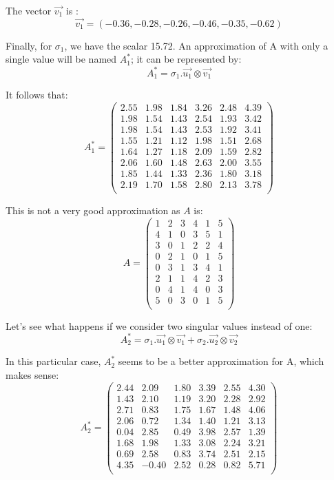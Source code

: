 \documentclass[a4,12pt,twosided,openany]{memoir}
\begin{document}
The vector $\overrightarrow{v_1}$ is :
\[\overrightarrow{v_1} = (-0.36, -0.28, -0.26, -0.46, -0.35, -0.62 )\]

Finally, for $\sigma_1$, we have the scalar 15.72. An approximation of A with only a single value will be named $A_1^*$; it can be represented by:
\[A^*_1 = \sigma_1.\overrightarrow{u_1} \otimes \overrightarrow{v_1}\]

It follows that:
\[A^*_1 = \begin{pmatrix}
2.55 &  1.98 & 1.84 &  3.26 &  2.48 & 4.39 \\
1.98 & 1.54 & 1.43 & 2.54 & 1.93 & 3.42 \\
1.98 & 1.54 & 1.43 & 2.53 &  1.92 & 3.41 \\
1.55 & 1.21 & 1.12 & 1.98 & 1.51 & 2.68 \\
1.64 & 1.27 & 1.18 & 2.09 & 1.59 & 2.82 \\
2.06 & 1.60 & 1.48 & 2.63 &  2.00 & 3.55 \\
1.85 & 1.44 & 1.33 & 2.36 & 1.80 & 3.18 \\
2.19 & 1.70 & 1.58 & 2.80 & 2.13 & 3.78 \\
\end{pmatrix}
\]
\par 
\indent
This is not a very good approximation as $A$ is:
\[A = \begin{pmatrix}
1 & 2 & 3 & 4 & 1 & 5\\
4 & 1 & 0 & 3 & 5 & 1\\
3 & 0 & 1 & 2 & 2 & 4\\
0 & 2 & 1 & 0 & 1 & 5\\
0 & 3 & 1 & 3 & 4 & 1\\
2 & 1 & 1 & 4 & 2 & 3\\
0 & 4 & 1 & 4 & 0 & 3\\
 5 & 0 & 3 & 0 & 1 & 5\\
\end{pmatrix}
\]
\par 
\indent
Let’s see what happens if we consider two singular values instead of one:
\[
A^*_2 = \sigma_1.\overrightarrow{u_1} \otimes \overrightarrow{v_1} +
\sigma_2.\overrightarrow{u_2} \otimes \overrightarrow{v_2}
\]
\par 
\indent
In this particular case, $A^*_2$ seems to be a better approximation for A, which makes sense:
\[A^*_2 = 
\begin{pmatrix}
2.44 & 2.09 & 1.80  & 3.39 & 2.55 & 4.30\\
1.43 & 2.10 &  1.19 & 3.20 & 2.28 & 2.92\\
2.71 & 0.83 & 1.75  & 1.67 & 1.48 & 4.06\\
2.06 & 0.72 & 1.34  & 1.40 & 1.21 & 3.13\\
0.04 & 2.85 & 0.49  & 3.98 & 2.57 & 1.39\\
1.68 & 1.98 & 1.33  & 3.08 & 2.24 & 3.21\\
0.69 & 2.58 & 0.83  & 3.74 & 2.51 & 2.15\\
4.35 & -0.40 & 2.52 & 0.28 & 0.82 & 5.71\\
\end{pmatrix}
\]
\end{document}
